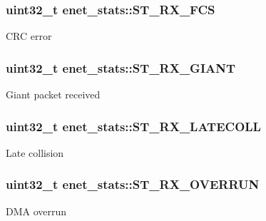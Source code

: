 \subsubsection[{\texorpdfstring{S\+T\+\_\+\+R\+X\+\_\+\+F\+CS}{ST_RX_FCS}}]{\setlength{\rightskip}{0pt plus 5cm}uint32\+\_\+t enet\+\_\+stats\+::\+S\+T\+\_\+\+R\+X\+\_\+\+F\+CS}\hypertarget{structenet__stats_ae6c33caa03ecfc10e6bc72f593fdf844}{}\label{structenet__stats_ae6c33caa03ecfc10e6bc72f593fdf844}
C\+RC error 
\subsubsection[{\texorpdfstring{S\+T\+\_\+\+R\+X\+\_\+\+G\+I\+A\+NT}{ST_RX_GIANT}}]{\setlength{\rightskip}{0pt plus 5cm}uint32\+\_\+t enet\+\_\+stats\+::\+S\+T\+\_\+\+R\+X\+\_\+\+G\+I\+A\+NT}\hypertarget{structenet__stats_ae8623cb8de996472d14f9f2ba3e687fc}{}\label{structenet__stats_ae8623cb8de996472d14f9f2ba3e687fc}
Giant packet received 
\subsubsection[{\texorpdfstring{S\+T\+\_\+\+R\+X\+\_\+\+L\+A\+T\+E\+C\+O\+LL}{ST_RX_LATECOLL}}]{\setlength{\rightskip}{0pt plus 5cm}uint32\+\_\+t enet\+\_\+stats\+::\+S\+T\+\_\+\+R\+X\+\_\+\+L\+A\+T\+E\+C\+O\+LL}\hypertarget{structenet__stats_aa3725b4386a8259a1ecbfeaf9c82e38e}{}\label{structenet__stats_aa3725b4386a8259a1ecbfeaf9c82e38e}
Late collision 
\subsubsection[{\texorpdfstring{S\+T\+\_\+\+R\+X\+\_\+\+O\+V\+E\+R\+R\+UN}{ST_RX_OVERRUN}}]{\setlength{\rightskip}{0pt plus 5cm}uint32\+\_\+t enet\+\_\+stats\+::\+S\+T\+\_\+\+R\+X\+\_\+\+O\+V\+E\+R\+R\+UN}\hypertarget{structenet__stats_aa5ec4719f4e2b5b7e26234126f033c57}{}\label{structenet__stats_aa5ec4719f4e2b5b7e26234126f033c57}
D\+MA overrun 
